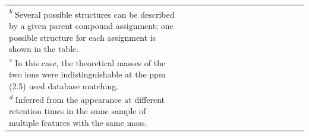 \begin{landscape}
\begin{scriptsize}
\begin{singlespace}
\begin{flushleft}
\begin{longtable}{ Lp{.11\linewidth} Lp{.05\linewidth} Lp{.07\linewidth} Lp{.08\linewidth} Lp{.08\linewidth} Lp{.06\linewidth} Lp{.04\linewidth} Lp{.36\linewidth}}
{\emph{\textsuperscript{b}} Several possible structures can be described by a given parent compound assignment; one possible structure for each assignment is shown in the table.\\
\emph{\textsuperscript{c}} In this case, the theoretical masses of the two ions were indistinguishable at the ppm (2.5) used database matching.\\
\emph{\textsuperscript{d}} Inferred from the appearance at different retention times in the same sample of multiple features with the same mass.
}
\end{longtable}
\end{flushleft}
\end{singlespace}
\end{scriptsize}

\end{landscape}

\clearpage

